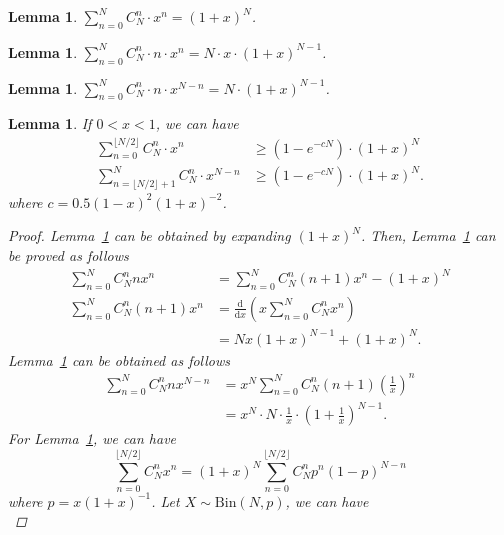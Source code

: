 \documentclass{article}
\newtheorem{lemma}[theorem]{Lemma}
\begin{document}
\begin{lemma}
\label{Sum1}
$\sum_{n=0}^{N}C_N^{n}\cdot x^{n}=(1+x)^N$.
\end{lemma}
\begin{lemma}
\label{Sum2}
$\sum_{n=0}^{N} C_N^{n}\cdot n\cdot x^{n}=N\cdot x\cdot (1+x)^{N-1}$.
\end{lemma}
\begin{lemma}
\label{Sum3}
$\sum_{n=0}^{N} C_N^{n}\cdot n\cdot x^{N-n}=N\cdot (1+x)^{N-1}$.
\end{lemma}
\begin{lemma}
\label{Sum4}
If $0<x<1$, we can have
\begin{equation*}
\begin{split}
\sum_{n=0}^{\lfloor N/2\rfloor} C_N^{n}\cdot x^{n} &\geq \left(1-e^{-cN}\right) \cdot (1+x)^{N}\\
\sum_{n=\lfloor N/2 \rfloor +1}^{N} C_N^{n}\cdot x^{N-n}&\geq \left(1-e^{-cN}\right) \cdot (1+x)^{N}.
\end{split}
\end{equation*}
where $c=0.5(1-x)^2(1+x)^{-2}$.
\begin{proof}
Lemma~\ref{Sum1} can be obtained by expanding $(1+x)^N$.
Then, Lemma~\ref{Sum2} can be proved as follows
\begin{equation}
\begin{split}
\sum_{n=0}^{N} C_N^{n} n x^{n}&=\sum_{n=0}^{N} C_N^{n} (n+1) x^{n}-(1+x)^N\\
\sum_{n=0}^{N} C_N^{n} (n+1) x^{n}&=\frac{\mathrm{d}}{\mathrm{d}x}\left(x\sum_{n=0}^{N} C_N^{n} x^{n}\right)\\
&=Nx(1+x)^{N-1}+(1+x)^N.
\end{split}
\end{equation}
Lemma~\ref{Sum3} can be obtained as follows
\begin{equation}
\begin{split}
\sum_{n=0}^{N} C_N^{n} n x^{N-n}&=x^N\sum_{n=0}^{N} C_N^{n} (n+1) \left(\frac{1}{x}\right)^n\\
&=x^N\cdot N\cdot \frac{1}{x}\cdot \left(1+\frac{1}{x}\right)^{N-1}.
\end{split}
\end{equation}
For Lemma~\ref{Sum4}, we can have
\begin{equation}
\sum_{n=0}^{\lfloor N/2\rfloor} C_N^{n} x^{n}=(1+x)^{N}\sum_{n=0}^{\lfloor N/2\rfloor} C_N^{n} p^n (1-p)^{N-n}
\end{equation}
where $p=x(1+x)^{-1}$. Let $X\sim \mathrm{Bin}(N, p)$, we can have
\begin{equation}

\end{equation}
\end{proof}
\end{lemma}
\end{document}
